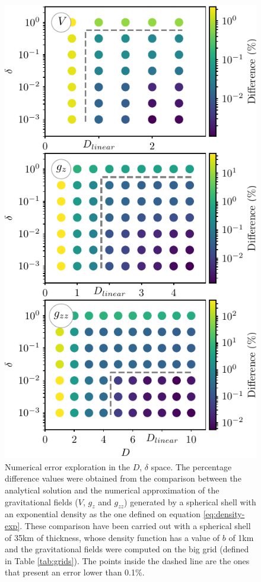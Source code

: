 \documentclass[extra]{gji}
\begin{document}
\begin{figure}
\centering
\includegraphics[width=\linewidth]
    {figures/grid-search.pdf}
\caption{
    Numerical error exploration in the $D$, $\delta$ space.
    The percentage difference values were obtained from the comparison
    between the analytical solution and the numerical approximation of
    the gravitational fields ($V$, $g_z$ and $g_{zz}$) generated by a
    spherical shell with an exponential density as the one defined on
    equation \ref{eq:density-exp}.
    These comparison have been carried out with a spherical shell of
    35km of thickness, whose density function has a value of $b$ of 1km
    and the gravitational fields were computed on the big grid
    (defined in Table \ref{tab:grids}).
    The points inside the dashed line are the ones that present an
    error lower than 0.1\%.
    }
\label{fig:grid-search}
\end{figure}
\end{document}
